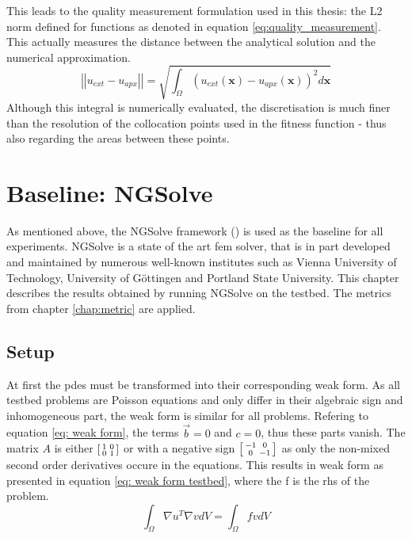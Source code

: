 \documentclass[./\jobname.tex]{subfiles}
\begin{document}
This leads to the quality measurement formulation used in this thesis: the L2 norm defined for functions as denoted in equation \ref{eq:quality_measurement}. This actually measures the distance between the analytical solution and the numerical approximation.  
\begin{equation}
\label{eq:quality_measurement}
\left|\left|u_{ext} - u_{apx}\right|\right| = \sqrt{\int_{\Omega} (u_{ext}(\mathbf{x}) - u_{apx}(\mathbf{x}))^2 d\mathbf{x}}
\end{equation}
Although this integral is numerically evaluated, the discretisation is much finer than the resolution of the collocation points used in the fitness function - thus also regarding the areas between these points.



\section{Baseline: NGSolve}
As mentioned above, the NGSolve framework (\cite{schoberl_ngsolvengsolve_2020}) is used as the baseline for all experiments. NGSolve is a state of the art \gls{fem} solver, that is in part developed and maintained by numerous well-known institutes such as Vienna University of Technology, University of Göttingen and Portland State University. This chapter describes the results obtained by running NGSolve on the testbed. The metrics from chapter \ref{chap:metric} are applied. 

\subsection{Setup}
At first the \gls{pde}s must be transformed into their corresponding weak form. As all testbed problems are Poisson equations and only differ in their algebraic sign and inhomogeneous part, the weak form is similar for all problems. Refering to equation \ref{eq: weak form}, the terms $\vec{b} = 0$ and $c = 0$, thus these parts vanish. The matrix $A$ is either $\begin{bsmallmatrix} 1 & 0 \\ 0 & 1 \end{bsmallmatrix}$ or with a negative sign $\begin{bsmallmatrix} -1 & 0 \\ 0 & -1 \end{bsmallmatrix}$ as only the non-mixed second order derivatives occure in the equations. This results in weak form as presented in equation \ref{eq: weak form testbed}, where the f is the \gls{rhs} of the problem.
\begin{equation}
\label{eq: weak form testbed}
\int_{\Omega} \nabla u^T \nabla v dV = \int_{\Omega} f v dV
\end{equation}
\end{document}
